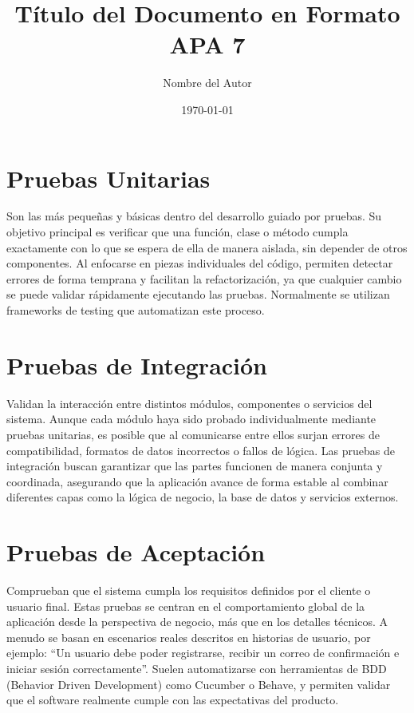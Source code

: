 \documentclass[12pt]{article} %
\title{Título del Documento en Formato APA 7}
\author{Nombre del Autor}
\date{\today}
\begin{document}
\imprimircaratula
\newpage

\section*{Pruebas Unitarias}

Son las más pequeñas y básicas dentro del desarrollo guiado por pruebas. Su objetivo principal es verificar que una función, clase o método cumpla exactamente con lo que se espera de ella de manera aislada, sin depender de otros componentes. Al enfocarse en piezas individuales del código, permiten detectar errores de forma temprana y facilitan la refactorización, ya que cualquier cambio se puede validar rápidamente ejecutando las pruebas. Normalmente se utilizan frameworks de testing que automatizan este proceso.

\section*{Pruebas de Integración}

Validan la interacción entre distintos módulos, componentes o servicios del sistema. Aunque cada módulo haya sido probado individualmente mediante pruebas unitarias, es posible que al comunicarse entre ellos surjan errores de compatibilidad, formatos de datos incorrectos o fallos de lógica. Las pruebas de integración buscan garantizar que las partes funcionen de manera conjunta y coordinada, asegurando que la aplicación avance de forma estable al combinar diferentes capas como la lógica de negocio, la base de datos y servicios externos.

\section*{Pruebas de Aceptación}

Comprueban que el sistema cumpla los requisitos definidos por el cliente o usuario final. Estas pruebas se centran en el comportamiento global de la aplicación desde la perspectiva de negocio, más que en los detalles técnicos. A menudo se basan en escenarios reales descritos en historias de usuario, por ejemplo: “Un usuario debe poder registrarse, recibir un correo de confirmación e iniciar sesión correctamente”. Suelen automatizarse con herramientas de BDD (Behavior Driven Development) como Cucumber o Behave, y permiten validar que el software realmente cumple con las expectativas del producto.
\end{document}
